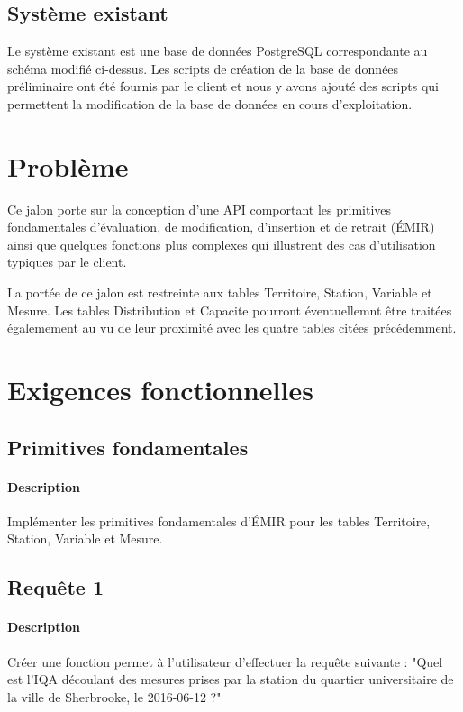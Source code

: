\documentclass{article}
\begin{document}
\subsection{Système existant}
Le système existant est une base de données PostgreSQL correspondante
au schéma modifié ci-dessus. Les scripts de création de la base de données préliminaire
ont été fournis par le client et nous y avons ajouté des scripts qui
permettent la modification de la base de données en cours d'exploitation.

\section{Problème}
Ce jalon porte sur la conception d'une API comportant les primitives
fondamentales d'évaluation, de modification, d'insertion et de retrait 
(ÉMIR) ainsi que quelques fonctions plus complexes qui illustrent
des cas d'utilisation typiques par le client.

La portée de ce jalon est restreinte aux tables Territoire, Station,
Variable et Mesure. Les tables Distribution et Capacite pourront éventuellemnt
être traitées égalemement au vu de leur proximité avec les quatre tables
citées précédemment.

\section{Exigences fonctionnelles}
\subsection{Primitives fondamentales}
\paragraph{Description} Implémenter les primitives fondamentales d'ÉMIR
pour les tables Territoire, Station, Variable et Mesure.

\subsection{Requête 1}
\paragraph{Description} Créer une fonction permet à l'utilisateur
d'effectuer la requête suivante : "Quel est l'IQA découlant des mesures
prises par la station du quartier universitaire de la ville de Sherbrooke,
le 2016-06-12 ?"
\end{document}
